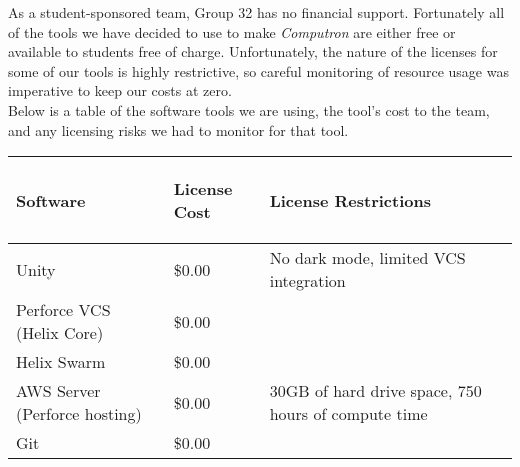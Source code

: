 As a student-sponsored team, Group 32 has no financial support. Fortunately all of 
the tools we have decided to use to make \textit{Computron} are either free or available 
to students free of charge. Unfortunately, the nature of the licenses for some of our 
tools is highly restrictive, so careful monitoring of resource usage was imperative to keep
our costs at zero.\\

Below is a table of the software tools we are using, the tool's cost to the team, and
 any licensing risks we had to monitor for that tool. 
\begin{center}
    \begin{tabular}{ | m{5cm} | m{4cm} | m{5cm} |} 
        \hline
            \begin{center}
                \textbf{Software}
            \end{center} & 
            \begin{center}
                \textbf{License Cost}
            \end{center} & 
            \begin{center}
                \textbf{License Restrictions}
            \end{center}\\
        \hline
            Unity & 
            \$0.00 & 
            No dark mode, limited VCS integration\\
        \hline
            Perforce VCS (Helix Core) & 
            \$0.00 & 
            \\
        \hline
            Helix Swarm & 
            \$0.00 & 
            \\
        \hline
            AWS Server (Perforce hosting) & 
            \$0.00 & 
            30GB of hard drive space, 750 hours of compute time\\
        \hline
            Git & 
            \$0.00 & 
            \\
        \hline
    \end{tabular}
\end{center}